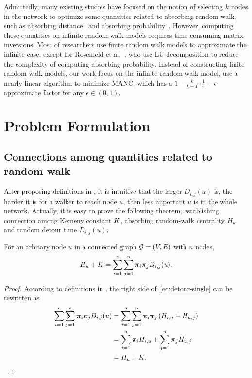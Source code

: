\documentclass[sigconf]{acmart}
\begin{document}
Admittedly, many existing studies have focused on the notion of selecting \(k\) nodes in the network to optimize some quantities related to absorbing random walk, such as absorbing distance~\cite{LiYuHuCh14,MoBaZhPe20,ZhLuWaGu17} and absorbing probability~\cite{ZhLuWaGu17,RoGl16}.
However, computing these quantities on infinite random walk models requires time-consuming matrix inversions.
Most of researchers use finite random walk models to approximate the infinite case, except for Rosenfeld et al.~\cite{RoGl16}, who use LU decomposition to reduce the complexity of computing absorbing probability.
Instead of constructing finite random walk models, our work focus on the infinite random walk model, use a nearly linear algorithm to minimize MANC, which has a \(1-\frac{k}{k-1}\cdot\frac{1}{e}-\epsilon\) approximate factor for any \(\epsilon\in(0,1)\).

\section{Problem Formulation}\label{sec:prob-form}

\subsection{Connections among quantities related to random walk}

After proposing definitions in , it is intuitive that the larger \(D_{i,j}(u)\) is, the harder it is for a walker to reach node \(u\), then less important \(u\) is in the whole network.
Actually, it is easy to prove the following theorem, establishing connection among Kemeny constant \(K\), absorbing random-walk centrality \(H_u\) and random detour time \(D_{i,j}(u)\).
\begin{theorem}\label{thm:connection-single}
    For an arbitary node \(u\) in a connected graph \(\mathcal{G}=(V,E)\) with \(n\) nodes,
    \begin{equation}\label{eq:detour-single}
        H_u+K=\sum_{i=1}^n\sum_{j=1}^n\boldsymbol{\pi}_i\boldsymbol{\pi}_jD_{i,j}(u).
    \end{equation}
\end{theorem}
\begin{proof}
    According to definitions in , the right side of~\eqref{eq:detour-single} can be rewritten as
    \begin{align*}
        \sum_{i=1}^n\sum_{j=1}^n\boldsymbol{\pi}_i\boldsymbol{\pi}_jD_{i,j}(u) & =\sum_{i=1}^n\sum_{j=1}^n\boldsymbol{\pi}_i\boldsymbol{\pi}_j\left( H_{i,u}+H_{u,j} \right) \\
                                                           & =\sum_{i=1}^n\boldsymbol{\pi}_iH_{i,u}+\sum_{j=1}^n\boldsymbol{\pi}_jH_{u,j}         \\
                                                           & =H_u+K.
    \end{align*}
\end{proof}
\end{document}
